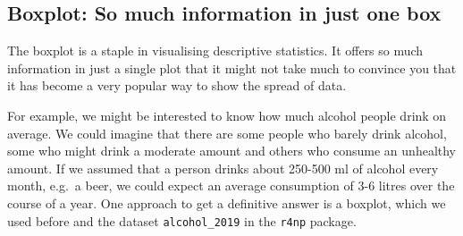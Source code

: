 \documentclass[
  letterpaper,
]{krantz}
\begin{document}
\subsection{Boxplot: So much information in just one
box}\label{sec-boxplot}

The boxplot is a staple in visualising descriptive statistics. It offers
so much information in just a single plot that it might not take much to
convince you that it has become a very popular way to show the spread of
data.

For example, we might be interested to know how much alcohol people
drink on average. We could imagine that there are some people who barely
drink alcohol, some who might drink a moderate amount and others who
consume an unhealthy amount. If we assumed that a person drinks about
250-500 ml of alcohol every month, e.g.~a beer, we could expect an
average consumption of 3-6 litres over the course of a year. One
approach to get a definitive answer is a boxplot, which we used before
and the dataset \texttt{alcohol\_2019} in the \texttt{r4np} package.
\end{document}
